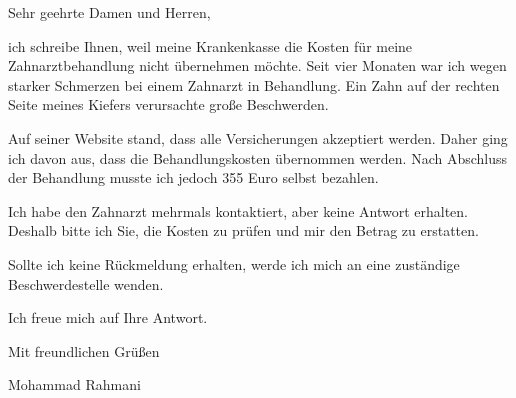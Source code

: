\documentclass[a4paper]{article}
\begin{document}
    Sehr geehrte Damen und Herren,
    
    ich schreibe Ihnen, weil meine Krankenkasse die Kosten für meine Zahnarztbehandlung nicht übernehmen möchte.
    Seit vier Monaten war ich wegen starker Schmerzen bei einem Zahnarzt in Behandlung.
    Ein Zahn auf der rechten Seite meines Kiefers verursachte große Beschwerden.
    
    Auf seiner Website stand, dass alle Versicherungen akzeptiert werden.
    Daher ging ich davon aus, dass die Behandlungskosten übernommen werden.
    Nach Abschluss der Behandlung musste ich jedoch 355 Euro selbst bezahlen.
    
    Ich habe den Zahnarzt mehrmals kontaktiert, aber keine Antwort erhalten.
    Deshalb bitte ich Sie, die Kosten zu prüfen und mir den Betrag zu erstatten.
    
    Sollte ich keine Rückmeldung erhalten, werde ich mich an eine zuständige Beschwerdestelle wenden.
    
    Ich freue mich auf Ihre Antwort.
    
    Mit freundlichen Grüßen
    
    Mohammad Rahmani
\end{document}
